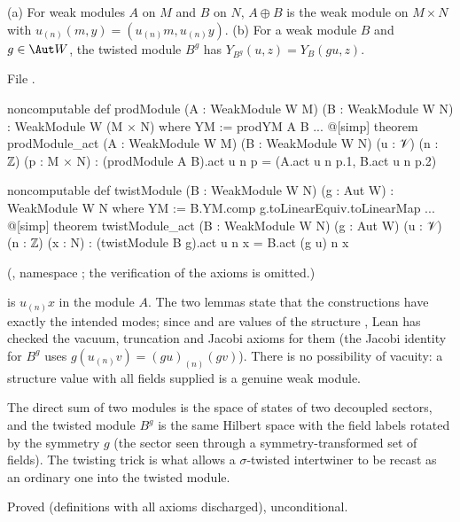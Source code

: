 \begin{definition}\label{ch12:def:prod_twist}
(a) For weak modules $A$ on $M$ and $B$ on $N$, $A\oplus B$ is the weak module on $M\times N$ with
$u_{(n)}(m,y)=(u_{(n)}m,u_{(n)}y)$.  (b) For a weak module $B$ and $g\in\Aut W$, the twisted module
$B^g$ has $Y_{B^g}(u,z)=Y_B(gu,z)$.
\end{definition}
File .
\begin{leancode}
noncomputable def prodModule (A : WeakModule W M) (B : WeakModule W N) :
    WeakModule W (M × N) where  YM := prodYM A B
  ...
@[simp] theorem prodModule_act (A : WeakModule W M) (B : WeakModule W N) (u : 𝒱) (n : ℤ)
    (p : M × N) : (prodModule A B).act u n p = (A.act u n p.1, B.act u n p.2)

noncomputable def twistModule (B : WeakModule W N) (g : Aut W) : WeakModule W N where  YM := B.YM.comp g.toLinearEquiv.toLinearMap
  ...
@[simp] theorem twistModule_act (B : WeakModule W N) (g : Aut W) (u : 𝒱) (n : ℤ) (x : N) :
    (twistModule B g).act u n x = B.act (g u) n x
\end{leancode}
(, namespace ; the
verification of the axioms is omitted.)
\begin{dictionary}
 is $u_{(n)}x$ in the module $A$.  The two  lemmas state that the
constructions have exactly the intended modes; since  and  are
values of the structure , Lean has checked the vacuum, truncation and Jacobi
axioms for them (the Jacobi identity for $B^g$ uses $g(u_{(n)}v)=(gu)_{(n)}(gv)$).  There is no
possibility of vacuity: a structure value with all fields supplied is a genuine weak module.
\end{dictionary}

\begin{physics}
The direct sum of two modules is the space of states of two decoupled sectors, and the twisted module $B^g$ is the same Hilbert space with the field labels rotated by the symmetry $g$ (the sector seen through a symmetry-transformed set of fields). The twisting trick is what allows a $\sigma$-twisted intertwiner to be recast as an ordinary one into the twisted module.
\end{physics}
\begin{status}Proved (definitions with all axioms discharged), unconditional.\end{status}

